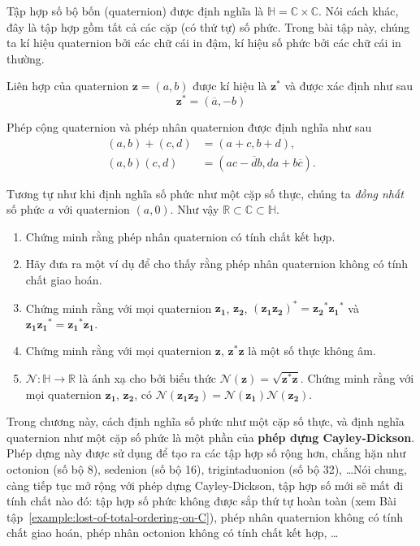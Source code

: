 \begin{exercise}[Quaternion]
	Tập hợp số bộ bốn (quaternion) được định nghĩa là $\mathbb{H} = \mathbb{C}\times\mathbb{C}$. Nói cách khác, đây là tập hợp gồm tất cả các cặp (có thứ tự) số phức. Trong bài tập này, chúng ta kí hiệu quaternion bởi các chữ cái in đậm, kí hiệu số phức bởi các chữ cái in thường.

	Liên hợp của quaternion $\mathbf{z} = (a, b)$ được kí hiệu là ${\mathbf{z}}^{*}$ và được xác định như sau
	\[
		{\mathbf{z}}^{*} = (\overline{a}, -b)
	\]

	Phép cộng quaternion và phép nhân quaternion được định nghĩa như sau
	\begin{align*}
		(a, b) + (c, d) & = (a+c, b+d), \\
		(a,b)(c,d) & = (ac - \overline{d}b, da + b\overline{c}).
	\end{align*}

	Tương tự như khi định nghĩa số phức như một cặp số thực, chúng ta \textit{đồng nhất} số phức $a$ với quaternion $(a, 0)$. Như vậy $\mathbb{R}\subset \mathbb{C}\subset \mathbb{H}$.

	\begin{enumerate}[label={(\roman*)}]
		\item Chứng minh rằng phép nhân quaternion có tính chất kết hợp.
		\item Hãy đưa ra một ví dụ để cho thấy rằng phép nhân quaternion không có tính chất giao hoán.
		\item Chứng minh rằng với mọi quaternion $\mathbf{z_{1}}$, $\mathbf{z_{2}}$, ${(\mathbf{z_{1}}{\mathbf{z_{2}}})}^{*} = {\mathbf{z_{2}}}^{*}{\mathbf{z_{1}}}^{*}$ và $\mathbf{z_{1}}\mathbf{z_{1}}^{*} = \mathbf{z_{1}}^{*}\mathbf{z_{1}}$.
		\item Chứng minh rằng với mọi quaternion $\mathbf{z}$, $\mathbf{z}^{*}\mathbf{z}$ là một số thực không âm.
		\item $\mathcal{N}: \mathbb{H}\to \mathbb{R}$ là ánh xạ cho bởi biểu thức $\mathcal{N}(\mathbf{z}) = \sqrt{\mathbf{z}^{*}\mathbf{z}}$. Chứng minh rằng với mọi quaternion $\mathbf{z_{1}}$, $\mathbf{z_{2}}$, có $\mathcal{N}(\mathbf{z_{1}}\mathbf{z_{2}}) = \mathcal{N}(\mathbf{z_{1}})\mathcal{N}(\mathbf{z_{2}})$.
	\end{enumerate}
\end{exercise}

Trong chương này, cách định nghĩa số phức như một cặp số thực, và định nghĩa quaternion như một cặp số phức là một phần của \textbf{phép dựng Cayley-Dickson}. Phép dựng này được sử dụng để tạo ra các tập hợp số rộng hơn, chẳng hặn như octonion (số bộ 8), sedenion (số bộ 16), trigintaduonion (số bộ 32), \ldots Nói chung, càng tiếp tục mở rộng với phép dựng Cayley-Dickson, tập hợp số mới sẽ mất đi tính chất nào đó: tập hợp số phức không được sắp thứ tự hoàn toàn (xem Bài tập~\ref{example:lost-of-total-ordering-on-C}), phép nhân quaternion không có tính chất giao hoán, phép nhân octonion không có tính chất kết hợp, \ldots
